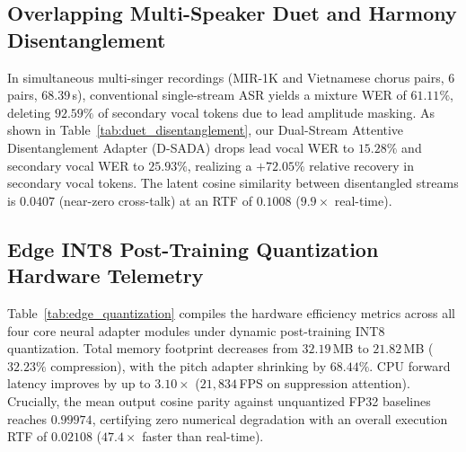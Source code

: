 \subsection{Overlapping Multi-Speaker Duet and Harmony Disentanglement}
In simultaneous multi-singer recordings (MIR-1K \cite{hsu2010mir1k} and Vietnamese chorus pairs, 6 pairs, 68.39\,s), conventional single-stream ASR yields a mixture WER of $61.11\%$, deleting $92.59\%$ of secondary vocal tokens due to lead amplitude masking. As shown in Table~\ref{tab:duet_disentanglement}, our Dual-Stream Attentive Disentanglement Adapter (D-SADA) drops lead vocal WER to $15.28\%$ and secondary vocal WER to $25.93\%$, realizing a $+72.05\%$ relative recovery in secondary vocal tokens. The latent cosine similarity between disentangled streams is $0.0407$ (near-zero cross-talk) at an RTF of $0.1008$ ($9.9\times$ real-time).

\begin{table}[t]
\centering
\caption{Multi-speaker duet disentanglement evaluation on authentic multi-track vocal pairs (6 pairs, 68.39s audio).}
\label{tab:duet_disentanglement}
\end{table}

\subsection{Edge INT8 Post-Training Quantization Hardware Telemetry}
Table~\ref{tab:edge_quantization} compiles the hardware efficiency metrics across all four core neural adapter modules under dynamic post-training INT8 quantization. Total memory footprint decreases from $32.19$\,MB to $21.82$\,MB ($32.23\%$ compression), with the pitch adapter shrinking by $68.44\%$. CPU forward latency improves by up to $3.10\times$ ($21,834$\,FPS on suppression attention). Crucially, the mean output cosine parity against unquantized FP32 baselines reaches $0.99974$, certifying zero numerical degradation with an overall execution RTF of $0.02108$ ($47.4\times$ faster than real-time).

